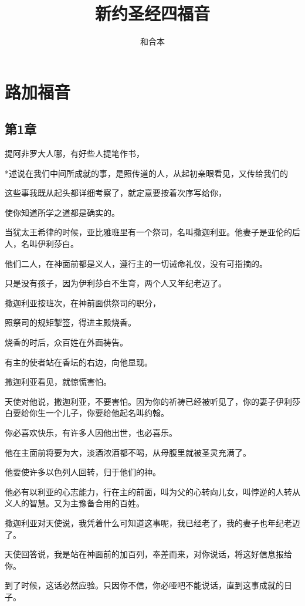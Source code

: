 \documentclass[12pt,oneside]{book}
\title{新约圣经四福音}
\author{和合本}
\begin{document}

\frontmatter


\setcounter{tocdepth}{2}    
\tableofcontents

\mainmatter


\part{路加福音}
\chapter{第1章}
提阿非罗大人哪，有好些人提笔作书，

*述说在我们中间所成就的事，是照传道的人，从起初亲眼看见，又传给我们的

这些事我既从起头都详细考察了，就定意要按着次序写给你，

使你知道所学之道都是确实的。

当犹太王希律的时候，亚比雅班里有一个祭司，名叫撒迦利亚。他妻子是亚伦的后人，名叫伊利莎白。

他们二人，在神面前都是义人，遵行主的一切诫命礼仪，没有可指摘的。

只是没有孩子，因为伊利莎白不生育，两个人又年纪老迈了。

撒迦利亚按班次，在神前面供祭司的职分，

照祭司的规矩掣签，得进主殿烧香。

烧香的时后，众百姓在外面祷告。

有主的使者站在香坛的右边，向他显现。

撒迦利亚看见，就惊慌害怕。

天使对他说，撒迦利亚，不要害怕。因为你的祈祷已经被听见了，你的妻子伊利莎白要给你生一个儿子，你要给他起名叫约翰。

你必喜欢快乐，有许多人因他出世，也必喜乐。

他在主面前将要为大，淡酒浓酒都不喝，从母腹里就被圣灵充满了。

他要使许多以色列人回转，归于他们的神。

他必有以利亚的心志能力，行在主的前面，叫为父的心转向儿女，叫悖逆的人转从义人的智慧。又为主豫备合用的百姓。

撒迦利亚对天使说，我凭着什么可知道这事呢，我已经老了，我的妻子也年纪老迈了。

天使回答说，我是站在神面前的加百列，奉差而来，对你说话，将这好信息报给你。

到了时候，这话必然应验。只因你不信，你必哑吧不能说话，直到这事成就的日子。
\end{document}
